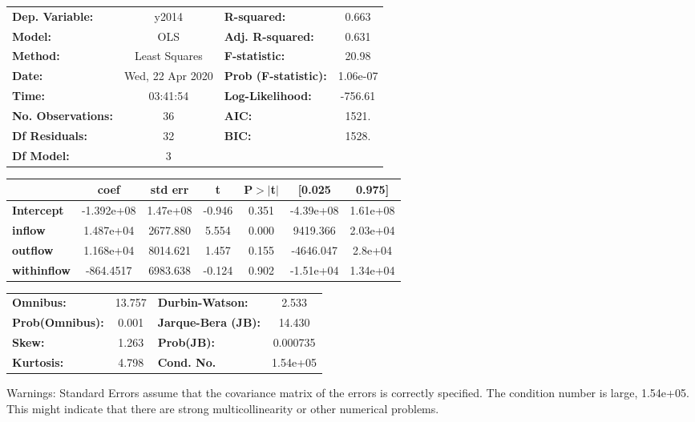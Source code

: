 \begin{center}
\begin{tabular}{lclc}
\toprule
\textbf{Dep. Variable:}    &      y2014       & \textbf{  R-squared:         } &     0.663   \\
\textbf{Model:}            &       OLS        & \textbf{  Adj. R-squared:    } &     0.631   \\
\textbf{Method:}           &  Least Squares   & \textbf{  F-statistic:       } &     20.98   \\
\textbf{Date:}             & Wed, 22 Apr 2020 & \textbf{  Prob (F-statistic):} &  1.06e-07   \\
\textbf{Time:}             &     03:41:54     & \textbf{  Log-Likelihood:    } &   -756.61   \\
\textbf{No. Observations:} &          36      & \textbf{  AIC:               } &     1521.   \\
\textbf{Df Residuals:}     &          32      & \textbf{  BIC:               } &     1528.   \\
\textbf{Df Model:}         &           3      & \textbf{                     } &             \\
\bottomrule
\end{tabular}
\begin{tabular}{lcccccc}
                    & \textbf{coef} & \textbf{std err} & \textbf{t} & \textbf{P$> |$t$|$} & \textbf{[0.025} & \textbf{0.975]}  \\
\midrule
\textbf{Intercept}  &   -1.392e+08  &     1.47e+08     &    -0.946  &         0.351        &    -4.39e+08    &     1.61e+08     \\
\textbf{inflow}     &    1.487e+04  &     2677.880     &     5.554  &         0.000        &     9419.366    &     2.03e+04     \\
\textbf{outflow}    &    1.168e+04  &     8014.621     &     1.457  &         0.155        &    -4646.047    &      2.8e+04     \\
\textbf{withinflow} &    -864.4517  &     6983.638     &    -0.124  &         0.902        &    -1.51e+04    &     1.34e+04     \\
\bottomrule
\end{tabular}
\begin{tabular}{lclc}
\textbf{Omnibus:}       & 13.757 & \textbf{  Durbin-Watson:     } &    2.533  \\
\textbf{Prob(Omnibus):} &  0.001 & \textbf{  Jarque-Bera (JB):  } &   14.430  \\
\textbf{Skew:}          &  1.263 & \textbf{  Prob(JB):          } & 0.000735  \\
\textbf{Kurtosis:}      &  4.798 & \textbf{  Cond. No.          } & 1.54e+05  \\
\bottomrule
\end{tabular}
\end{center}

Warnings: \newline
 [1] Standard Errors assume that the covariance matrix of the errors is correctly specified. \newline
 [2] The condition number is large, 1.54e+05. This might indicate that there are \newline
 strong multicollinearity or other numerical problems.